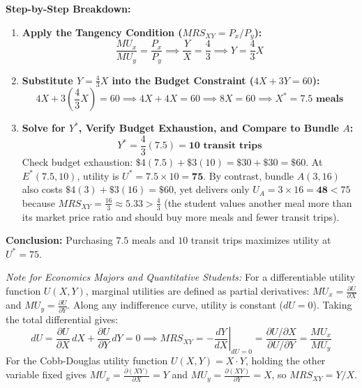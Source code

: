\documentclass[11pt,letterpaper]{article}
\begin{document}
\noindent\textbf{Step-by-Step Breakdown:}
\begin{enumerate}
    \item \textbf{Apply the Tangency Condition ($MRS_{XY} = P_x / P_y$):}
    \[
    \frac{MU_x}{MU_y} = \frac{P_x}{P_y} \implies \frac{Y}{X} = \frac{4}{3} \implies Y = \frac{4}{3}X
    \]

    \item \textbf{Substitute $Y = \frac{4}{3}X$ into the Budget Constraint ($4X + 3Y = 60$):}
    \[
    4X + 3\left(\frac{4}{3}X\right) = 60 \implies 4X + 4X = 60 \implies 8X = 60 \implies X^* = \mathbf{7.5\text{ meals}}
    \]

    \item \textbf{Solve for $Y^*$, Verify Budget Exhaustion, and Compare to Bundle $A$:}
    \[
    Y^* = \frac{4}{3}(7.5) = \mathbf{10\text{ transit trips}}
    \]
    Check budget exhaustion: $\$4(7.5) + \$3(10) = \$30 + \$30 = \$60$. At $E^*(7.5, 10)$, utility is $U^* = 7.5 \times 10 = \mathbf{75}$. By contrast, bundle $A(3, 16)$ also costs $\$4(3) + \$3(16) = \$60$, yet delivers only $U_A = 3 \times 16 = \mathbf{48} < 75$ because $MRS_{XY} = \frac{16}{3} \approx 5.33 > \frac{4}{3}$ (the student values another meal more than its market price ratio and should buy more meals and fewer transit trips).
\end{enumerate}
\textbf{Conclusion:} Purchasing $7.5$ meals and $10$ transit trips maximizes utility at $U^* = 75$.

\begin{tcolorbox}[colback=LightSlate,colframe=CourseBlue,title=\textbf{Optional Advanced Section: Partial Derivatives and the Marginal Rate of Substitution}]
\small
\emph{Note for Economics Majors and Quantitative Students:}
For a differentiable utility function $U(X, Y)$, marginal utilities are defined as partial derivatives: $MU_x = \frac{\partial U}{\partial X}$ and $MU_y = \frac{\partial U}{\partial Y}$. Along any indifference curve, utility is constant ($dU = 0$). Taking the total differential gives:
\[
dU = \frac{\partial U}{\partial X}\,dX + \frac{\partial U}{\partial Y}\,dY = 0 \implies MRS_{XY} = -\left.\frac{dY}{dX}\right|_{dU=0} = \frac{\partial U / \partial X}{\partial U / \partial Y} = \frac{MU_x}{MU_y}
\]
For the Cobb-Douglas utility function $U(X, Y) = X \cdot Y$, holding the other variable fixed gives $MU_x = \frac{\partial (XY)}{\partial X} = Y$ and $MU_y = \frac{\partial (XY)}{\partial Y} = X$, so $MRS_{XY} = Y / X$.
\end{tcolorbox}
\end{document}
